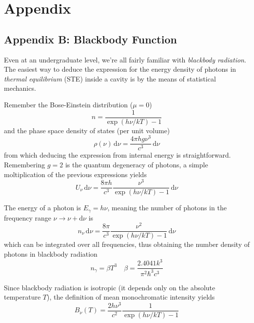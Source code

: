 \chapter{Appendix}\label{ch:appendix}

\section*{Appendix B: Blackbody Function}

Even at an undergraduate level, we're all fairly familiar with \emph{blackbody radiation}. The easiest way to deduce the expression for the energy density of photons in \emph{thermal equilibrium} (STE) inside a cavity is by the means of statistical mechanics.
\par Remember the Bose-Einstein distribution ($\mu = 0$)
\begin{equation*}
	n = \frac{1}{\exp(h\nu/kT)-1}
\end{equation*}
and the phase space density of states (per unit volume)
\begin{equation*}
	\rho(\nu)\,\text{d}\nu = \frac{4\pi h g \nu^{3}}{c^{3}}\,\text{d}\nu
\end{equation*}
from which deducing the expression from internal energy is straightforward. Remembering $g=2$ is the quantum degeneracy of photons, a simple moltiplication of the previous expressions yields
\begin{equation}
	U_{\nu}\,\text{d}\nu = \frac{8\pi h}{c^{3}}\frac{\nu^{3}}{\exp(h\nu/kT)-1}\,\text{d}\nu
    \label{eq:blackbody_endens}
\end{equation}
\par The energy of a photon is $E_{\gamma} = h\nu$, meaning the number of photons in the frequency range $\nu \to \nu + \text{d}\nu$ is
\begin{equation}
    n_{\nu}\,\text{d}\nu = \frac{8\pi}{c^{3}}\frac{\nu^{2}}{\exp(h\nu/kT)-1}\,\text{d}\nu
    \label{eq:blackbody_numdens}
\end{equation}
which can be integrated over all frequencies, thus obtaining the number density of photons in blackbody radiation
\begin{equation}
    n_{\gamma} = \beta T^{3} \quad \beta = \frac{2.4041 k^{3}}{\pi^{2}\hbar^{3}c^{3}}
    \label{eq:blackbody_totnum}
\end{equation}
\par Since blackbody radiation is isotropic (it depends only on the absolute temperature $T$), the definition of mean monochromatic intensity yields
\begin{equation}
	\boxed{
	B_{\nu}(T) = \frac{2h\nu^{3}}{c^{2}}\frac{1}{\exp(h\nu/kT)-1}
	}
	\label{eq:blackbodyintensity}
\end{equation}
